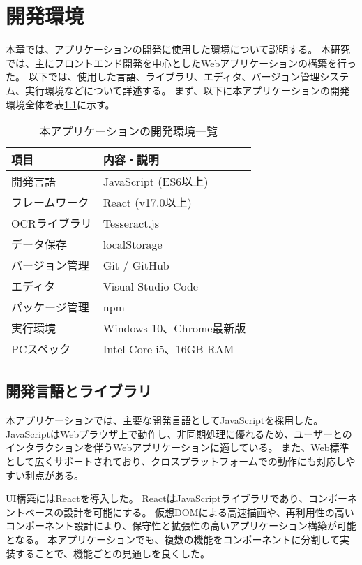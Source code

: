 \documentclass[main]{subfiles}
\begin{document}
\chapter{開発環境}
\label{cha:environment}
本章では、アプリケーションの開発に使用した環境について説明する。
本研究では、主にフロントエンド開発を中心としたWebアプリケーションの構築を行った。
以下では、使用した言語、ライブラリ、エディタ、バージョン管理システム、実行環境などについて詳述する。
まず、以下に本アプリケーションの開発環境全体を表\ref{tab:dev_environment}に示す。

\begin{table}[htbp]
\centering
\caption{本アプリケーションの開発環境一覧}
\label{tab:dev_environment}
\begin{tabular}{ll}
\hline
項目 & 内容・説明 \\
\hline
開発言語 & JavaScript (ES6以上) \\
フレームワーク & React (v17.0以上) \\
OCRライブラリ & Tesseract.js \\
データ保存 & localStorage \\
バージョン管理 & Git / GitHub \\
エディタ & Visual Studio Code \\
パッケージ管理 & npm \\
実行環境 & Windows 10、Chrome最新版 \\
PCスペック & Intel Core i5、16GB RAM \\
\hline
\end{tabular}
\end{table}

\section{開発言語とライブラリ}

本アプリケーションでは、主要な開発言語としてJavaScriptを採用した。  
JavaScriptはWebブラウザ上で動作し、非同期処理に優れるため、ユーザーとのインタラクションを伴うWebアプリケーションに適している。  
また、Web標準として広くサポートされており、クロスプラットフォームでの動作にも対応しやすい利点がある。

UI構築にはReactを導入した。  
ReactはJavaScriptライブラリであり、コンポーネントベースの設計を可能にする。  
仮想DOMによる高速描画や、再利用性の高いコンポーネント設計により、保守性と拡張性の高いアプリケーション構築が可能となる。  
本アプリケーションでも、複数の機能をコンポーネントに分割して実装することで、機能ごとの見通しを良くした。
\end{document}
